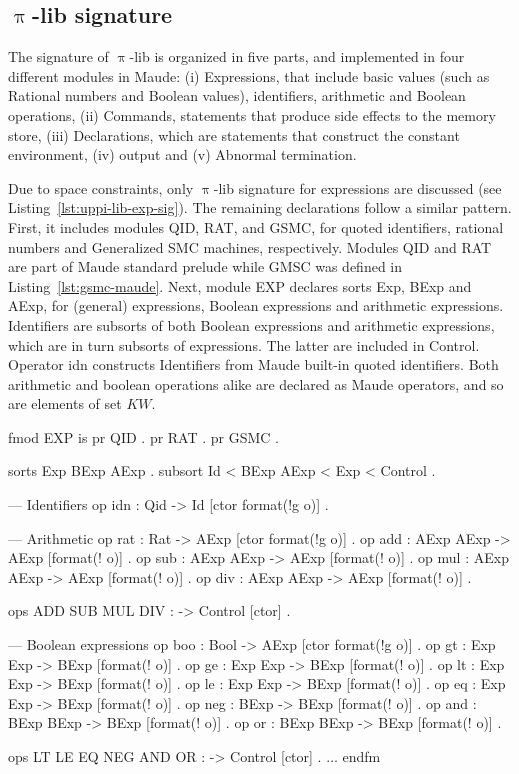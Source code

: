 \documentclass{llncs}%
\begin{document}
\subsection{$\uppi$-lib signature}\label{sec:uppi-lib-sig}

The signature of $\uppi$-lib is organized in five parts, and implemented in four different modules in Maude: (i) Expressions, that include basic values (such as Rational numbers and Boolean values), identifiers, arithmetic and Boolean operations, (ii) Commands, statements that produce side effects to the memory store, (iii) Declarations, which are statements that construct the constant environment, (iv) output and (v) Abnormal termination.

Due to space constraints, only $\uppi$-lib signature for expressions are discussed (see Listing~\ref{lst:uppi-lib-exp-sig}). The remaining declarations follow a similar pattern. First, it includes modules QID, RAT, and GSMC, for quoted identifiers, rational numbers and Generalized SMC machines, respectively.  Modules QID and RAT are part of Maude standard prelude while GMSC was defined in Listing~\ref{lst:gsmc-maude}. Next, module EXP declares sorts Exp, BExp and AExp, for (general) expressions, Boolean expressions and arithmetic expressions. Identifiers are subsorts of both Boolean expressions and arithmetic expressions, which are in turn subsorts of expressions. The latter are included in Control. Operator idn constructs Identifiers from Maude built-in quoted identifiers. Both arithmetic and boolean operations alike are declared as Maude operators, and so are elements of set $\mathit{KW}$.    
\begin{maude}[caption=Signature for $\uppi$-lib  expressions in Maude, label=lst:uppi-lib-exp-sig]
fmod EXP is
    pr QID . pr RAT .
    pr GSMC .
      
    sorts Exp BExp AExp .
    subsort Id < BExp AExp < Exp < Control .

    --- Identifiers
    op idn : Qid -> Id [ctor format(!g o)] .

    --- Arithmetic
    op rat : Rat -> AExp [ctor format(!g o)] .
    op add : AExp AExp -> AExp [format(! o)] .
    op sub : AExp AExp -> AExp [format(! o)] .
    op mul : AExp AExp -> AExp [format(! o)] .
    op div : AExp AExp -> AExp [format(! o)] .

    ops ADD SUB MUL DIV : -> Control [ctor] .

    --- Boolean expressions
    op boo : Bool -> AExp [ctor format(!g o)] .
    op gt : Exp Exp -> BExp [format(! o)] .
    op ge : Exp Exp -> BExp [format(! o)] .
    op lt : Exp Exp -> BExp [format(! o)] .
    op le : Exp Exp -> BExp [format(! o)] .
    op eq : Exp Exp -> BExp [format(! o)] .
    op neg : BExp -> BExp [format(! o)] .
    op and : BExp BExp -> BExp [format(! o)] .
    op or : BExp BExp -> BExp [format(! o)] .

    ops LT LE EQ NEG AND OR : -> Control [ctor] .
    $\ldots$
 endfm
 \end{maude}
\end{document}
